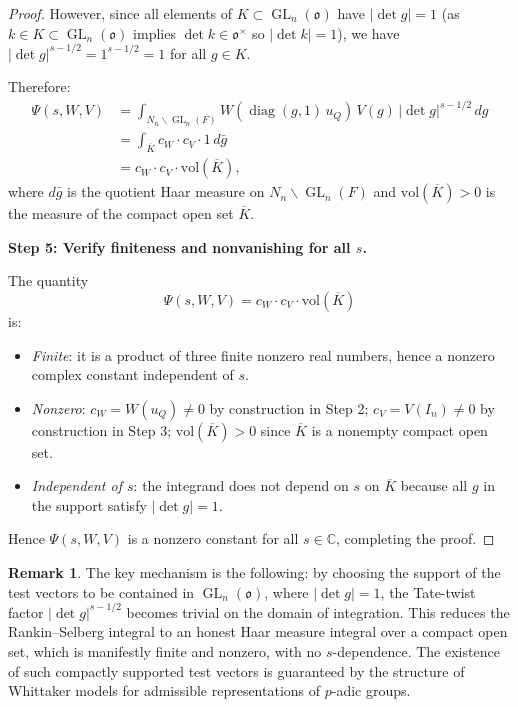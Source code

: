 \documentclass[12pt]{article}
\theoremstyle{definition}
\newtheorem{remark}[theorem]{Remark}
\DeclareMathOperator{\diag}{diag}
\DeclareMathOperator{\GL}{GL}
\begin{document}
\begin{proof}
However, since all elements of $K \subset \GL_n(\mathfrak{o})$ have $|\det g| = 1$ (as
$k \in K \subset \GL_n(\mathfrak{o})$ implies $\det k \in \mathfrak{o}^\times$ so
$|\det k| = 1$), we have $|\det g|^{s-1/2} = 1^{s-1/2} = 1$ for all $g \in K$.

Therefore:
\begin{align*}
  \Psi(s, W, V)
  &= \int_{N_n \backslash \GL_n(F)} W(\diag(g,1)\,u_Q)\, V(g)\, |\det g|^{s-1/2}\, dg \\
  &= \int_{\overline{K}} c_W \cdot c_V \cdot 1 \, d\bar{g} \\
  &= c_W \cdot c_V \cdot \mathrm{vol}(\overline{K}),
\end{align*}
where $d\bar{g}$ is the quotient Haar measure on $N_n \backslash \GL_n(F)$ and
$\mathrm{vol}(\overline{K}) > 0$ is the measure of the compact open set $\overline{K}$.

\medskip
\noindent\textbf{Step 5: Verify finiteness and nonvanishing for all $s$.}

The quantity
\[
  \Psi(s, W, V) = c_W \cdot c_V \cdot \mathrm{vol}(\overline{K})
\]
is:
\begin{itemize}
  \item \emph{Finite}: it is a product of three finite nonzero real numbers, hence
    a nonzero complex constant independent of $s$.
  \item \emph{Nonzero}: $c_W = W(u_Q) \neq 0$ by construction in Step 2;
    $c_V = V(I_n) \neq 0$ by construction in Step 3;
    $\mathrm{vol}(\overline{K}) > 0$ since $\overline{K}$ is a nonempty compact open set.
  \item \emph{Independent of $s$}: the integrand does not depend on $s$ on $\overline{K}$
    because all $g$ in the support satisfy $|\det g| = 1$.
\end{itemize}

Hence $\Psi(s, W, V)$ is a nonzero constant for all $s \in \mathbb{C}$, completing the proof.
\end{proof}

\begin{remark}
  The key mechanism is the following: by choosing the support of the test vectors to be
  contained in $\GL_n(\mathfrak{o})$, where $|\det g| = 1$, the Tate-twist factor
  $|\det g|^{s-1/2}$ becomes trivial on the domain of integration. This reduces the
  Rankin--Selberg integral to an honest Haar measure integral over a compact open set,
  which is manifestly finite and nonzero, with no $s$-dependence. The existence of
  such compactly supported test vectors is guaranteed by the structure of Whittaker
  models for admissible representations of $p$-adic groups.
\end{remark}
\end{document}

